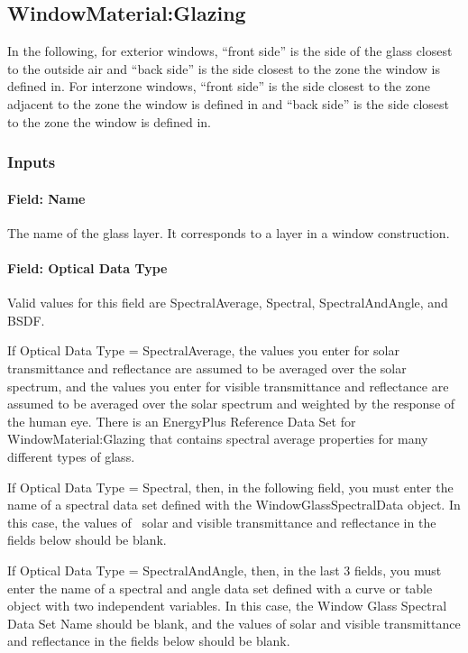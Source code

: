 \subsection{WindowMaterial:Glazing}\label{windowmaterialglazing}

In the following, for exterior windows, ``front side'' is the side of the glass closest to the outside air and ``back side'' is the side closest to the zone the window is defined in. For interzone windows, ``front side'' is the side closest to the zone adjacent to the zone the window is defined in and ``back side'' is the side closest to the zone the window is defined in.

\subsubsection{Inputs}\label{inputs-13-015}

\paragraph{Field: Name}\label{field-name-7-020}

The name of the glass layer. It corresponds to a layer in a window construction.

\paragraph{Field: Optical Data Type}\label{field-optical-data-type}

Valid values for this field are SpectralAverage, Spectral, SpectralAndAngle, and BSDF.

If Optical Data Type = SpectralAverage, the values you enter for solar transmittance and reflectance are assumed to be averaged over the solar spectrum, and the values you enter for visible transmittance and reflectance are assumed to be averaged over the solar spectrum and weighted by the response of~ the human eye. There is an EnergyPlus Reference Data Set for WindowMaterial:Glazing that contains spectral average properties for many different types of glass.

If Optical Data Type = Spectral, then, in the following field, you must enter the name of a spectral data set defined with the WindowGlassSpectralData object. In this case, the values of~ solar and visible transmittance and reflectance in the fields below should be blank.

If Optical Data Type = SpectralAndAngle, then, in the last 3 fields, you must enter the name of a spectral and angle data set defined with a curve or table object with two independent variables. In this case, the Window Glass Spectral Data Set Name should be blank, and the values of solar and visible transmittance and reflectance in the fields below should be blank.


